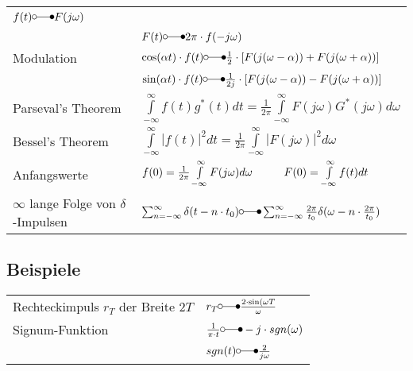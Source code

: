 \begin{tabular}{|p{8cm}|p{8cm}|}
			$f(t) \laplace F(j\omega)\nonumber$ \\
 			& $F(t) \laplace 2\pi \cdot f(-j\omega)$\\
 			\hline
 			Modulation &
 			$\cos(\alpha t) \cdot f(t)  \laplace  \frac{1}{2}\cdot
 			\left[F(j(\omega-\alpha)) + F(j(\omega+\alpha))\right ]$\\
 			& $\sin(\alpha t) \cdot f(t) \laplace \frac{1}{2j}\cdot \left[
 			F(j(\omega-\alpha)) - F(j(\omega+\alpha))\right ]$\\
 			\hline
        	Parseval's Theorem &
 			$\int\limits_{-\infty}^{\infty}f(t)g^{\ast}(t)dt = \frac{1}{2\pi}
  			\int\limits_{-\infty}^{\infty}F(j\omega)G^{\ast}(j\omega)d\omega$\\
  			\hline
  			Bessel's Theorem &
  			$\int\limits_{-\infty}^{\infty}|f(t)|^2 dt = \frac{1}{2\pi}
  			\int\limits_{-\infty}^{\infty}|F(j\omega)|^2 d\omega$\\
  			\hline 			
			Anfangswerte &
			$f(0)=\frac{1}{2\pi}\int\limits_{-\infty}^{\infty}F(j\omega)d\omega
			\hspace*{1cm} F(0)=\int\limits_{-\infty}^{\infty}f(t)dt$\\
			\hline
			$\infty$ lange Folge von $\delta$-Impulsen &
			$\sum_{n=-\infty}^{\infty} \delta(t-n\cdot t_0) \laplace
			\sum_{n=-\infty}^{\infty} \frac{2\pi}{t_0}\delta(\omega-n\cdot
			\frac{2\pi}{t_0})$\\
			\hline
        \end{tabular}
        
\subsection{Beispiele}
\begin{tabular}{l l}
Rechteckimpuls $r_T$ der Breite $2T$ & $r_T \laplace \frac{2 \cdot \sin(\omega T}{\omega}$ \\
Signum-Funktion & $\frac{1}{\pi \cdot t} \laplace -j \cdot sgn(\omega)$ \\
				& $sgn(t) \laplace \frac{2}{j\omega}$ \\
\end{tabular}
